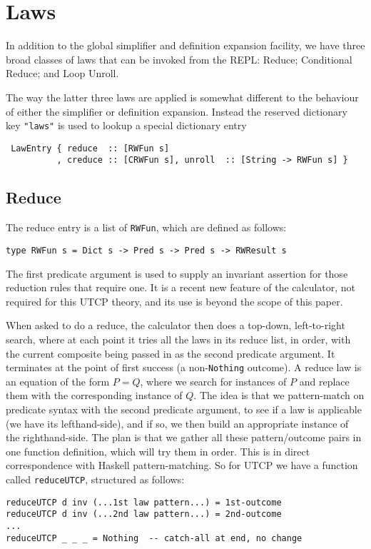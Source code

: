 \section{Laws}\label{sec:Laws}

In addition to the global simplifier and definition expansion facility,
we have three broad classes of laws that can be invoked from the REPL:
Reduce; Conditional Reduce; and Loop Unroll.

The way the latter three laws are applied is somewhat different
to the behaviour of either the simplifier or definition expansion.
Instead the reserved dictionary key \verb$"laws"$ is used
to lookup a special dictionary entry
\begin{verbatim}
 LawEntry { reduce  :: [RWFun s]
          , creduce :: [CRWFun s], unroll  :: [String -> RWFun s] }
\end{verbatim}

\subsection{Reduce}

The reduce entry is a list of \texttt{RWFun},
which are defined as follows:
\begin{verbatim}
type RWFun s = Dict s -> Pred s -> Pred s -> RWResult s
\end{verbatim}
The first predicate argument is used to supply an invariant
assertion for those reduction rules that require one.
It is a recent new feature of the calculator,
not required for this UTCP theory,
and its use is beyond the scope of this paper.

When asked to do a reduce,
the calculator then does a top-down, left-to-right search,
where at each point it tries all the laws in its reduce list, in order,
with the current composite being passed in as the second predicate
argument.
It terminates at the point of first success (a non-\texttt{Nothing} outcome).
A reduce law is an equation of the form $P = Q$,
where we search for instances of $P$ and replace them with the
corresponding instance of $Q$.
The idea is that we pattern-match on predicate syntax
with the second predicate argument,
to see if a law is applicable (we have its lefthand-side),
and if so,
we then build an appropriate instance of the righthand-side.
The plan is that we gather all these pattern/outcome pairs
in one function definition,
which will try them in order.
This is in direct correspondence with Haskell pattern-matching.
So for UTCP we have a function called \texttt{reduceUTCP},
structured as follows:
\begin{verbatim}
reduceUTCP d inv (...1st law pattern...) = 1st-outcome
reduceUTCP d inv (...2nd law pattern...) = 2nd-outcome
...
reduceUTCP _ _ _ = Nothing  -- catch-all at end, no change
\end{verbatim}

